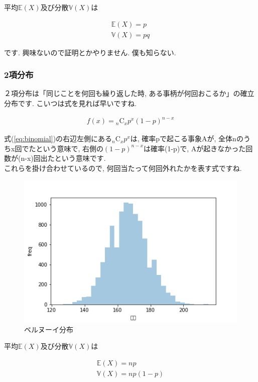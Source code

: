 \documentclass[11pt,a4paper]{jsarticle}                    %
\begin{document}
平均$\mathbb{E}(X)$及び分散$\mathbb{V}(X)$は

\begin{eqnarray}
\mathbb{E}(X) = p\\
\mathbb{V}(X) = pq
\end{eqnarray}

です. 興味ないので証明とかやりません. 僕も知らない.
\subsubsection{2項分布}
２項分布は「同じことを何回も繰り返した時, ある事柄が何回おこるか」の確立分布です. こいつは式を見れば早いですね.

\begin{eqnarray}
\label{eq:binomial}
f(x) = {}_n\mathrm{C}_x p^x(1-p)^{n-x}
\end{eqnarray}

式(\ref{eq:binomial})の右辺左側にある${}_n\mathrm{C}_x p^x$は, 確率pで起こる事象Aが, 全体nのうちx回でたという意味で, 右側の$(1-p)^{n-x}$は確率(1-p)で, Aが起きなかった回数が(n-x)回出たという意味です.\\
これらを掛け合わせているので, 何回当たって何回外れたかを表す式ですね.

\begin{figure}[H]
\label{im:bernoulli}
  \centering
  \includegraphics[width=120mm,bb=0 0 432 288]{../figures/binomial.png}
  \caption{ベルヌーイ分布}
\end{figure}

平均$\mathbb{E}(X)$及び分散$\mathbb{V}(X)$は

\begin{eqnarray}
\mathbb{E}(X) = np\\
\mathbb{V}(X) = np(1-p)
\end{eqnarray}
\end{document}
